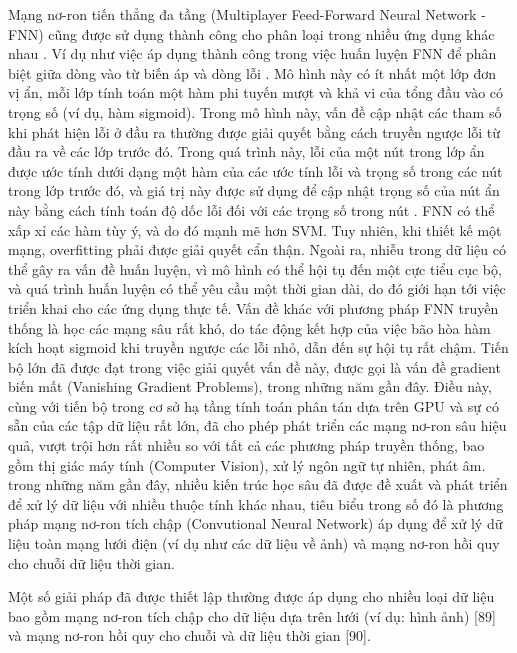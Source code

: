\documentclass[utf8]{frontiersSCNS} %
\begin{document}
Mạng nơ-ron tiến thẳng đa tầng (Multiplayer Feed-Forward Neural Network - FNN) cũng được sử dụng thành công cho phân loại trong nhiều ứng dụng khác nhau \citep{Zhang2000}. Ví dụ như việc áp dụng thành công trong việc huấn luyện FNN để phân biệt giữa dòng vào từ biến áp và dòng lỗi \citep{Perez1994}. Mô hình này có ít nhất một lớp đơn vị ẩn, mỗi lớp tính toán một hàm phi tuyến mượt và khả vi của tổng đầu vào có trọng số (ví dụ, hàm sigmoid). Trong mô hình này, vấn đề cập nhật các tham số khi phát hiện lỗi ở đầu ra thường được giải quyết bằng cách truyền ngược lỗi từ đầu ra về các lớp trước đó. Trong quá trình này, lỗi của một nút trong lớp ẩn được ước tính dưới dạng một hàm của các ước tính lỗi và trọng số trong các nút trong lớp trước đó, và giá trị này được sử dụng để cập nhật trọng số của nút ẩn này bằng cách tính toán độ dốc lỗi đối với các trọng số trong nút \citep{Werbos1994}. FNN có thể xấp xỉ các hàm tùy ý, và do đó mạnh mẽ hơn SVM. Tuy nhiên, khi thiết kế một mạng, overfitting phải được giải quyết cẩn thận. Ngoài ra, nhiễu trong dữ liệu có thể gây ra vấn đề huấn luyện, vì mô hình có thể hội tụ đến một cực tiểu cục bộ, và quá trình huấn luyện có thể yêu cầu một thời gian dài, do đó giới hạn tới việc triển khai cho các ứng dụng thực tế. Vấn đề khác với phương pháp FNN truyền thống là học các mạng sâu rất khó, do tác động kết hợp của việc bão hòa hàm kích hoạt sigmoid khi truyền ngược các lỗi nhỏ, dẫn đến sự hội tụ rất chậm. Tiến bộ lớn đã được đạt trong việc giải quyết vấn đề này, được gọi là vấn đề gradient biến mất (Vanishing Gradient Problems), trong những năm gần đây. Điều này, cùng với tiến bộ trong cơ sở hạ tầng tính toán phân tán dựa trên GPU và sự có sẵn của các tập dữ liệu rất lớn, đã cho phép phát triển các mạng nơ-ron sâu hiệu quả, vượt trội hơn rất nhiều so với tất cả các phương pháp truyền thống, bao gồm thị giác máy tính (Computer Vision), xử lý ngôn ngữ tự nhiên, phát âm. trong những năm gần đây, nhiều kiến trúc học sâu đã được đề xuất và phát triển để xử lý dữ liệu với nhiều thuộc tính khác nhau, tiêu biểu trong số đó là phương pháp mạng nơ-ron tích chập (Convutional Neural Network) áp dụng để xử lý dữ liệu toàn mạng lưới điện (ví dụ như các dữ liệu về ảnh) và mạng nơ-ron hồi quy cho chuỗi dữ liệu thời gian.


Một số giải pháp đã được thiết lập thường được áp dụng cho nhiều loại dữ liệu bao gồm mạng nơ-ron tích chập cho dữ liệu dựa trên lưới (ví dụ: hình ảnh) [89] và mạng nơ-ron hồi quy cho chuỗi và dữ liệu thời gian [90].
\end{document}
